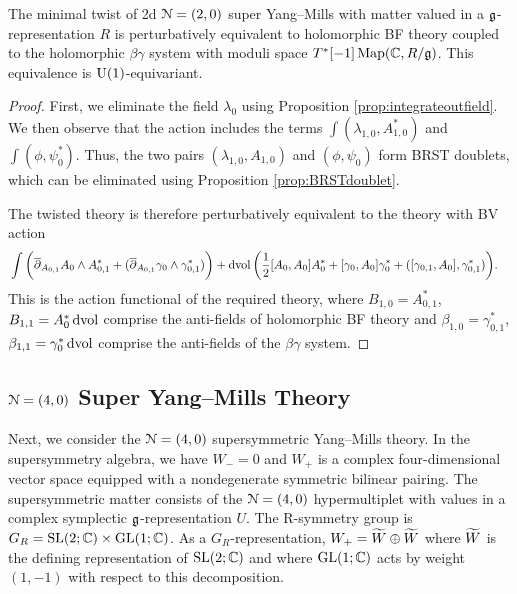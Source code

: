 \documentclass[10pt, oneside]{article}
\begin{document}
\begin{theorem} \label{thm:2d(2,0)}
The minimal twist of 2d $\cN=(2,0)$ super Yang--Mills with matter valued in a $\fg$-representation $R$ is perturbatively equivalent to holomorphic BF theory coupled to the holomorphic $\beta\gamma$ system with moduli space $T^*[-1] \map(\CC , R / \fg)$.
This equivalence is $\U(1)$-equivariant.
\end{theorem}
\begin{proof}
First, we eliminate the field $\lambda_{0}$ using Proposition \ref{prop:integrateoutfield}.  
We then observe that the action includes the terms $\int  (\lambda_{1,0} , A_{1,0}^*)$ and  $\int (\phi, \psi_0^*)$.  
Thus, the two pairs $(\lambda_{1,0}, A_{1,0})$ and $(\phi, \psi_0)$ form BRST doublets, 
which can be eliminated using Proposition \ref{prop:BRSTdoublet}.  

The twisted theory is therefore perturbatively equivalent to the theory with BV action 
\begin{align*}
& \int \bigg(\dbar_{A_{0,1}} A_{0} \wedge A_{0,1}^* + (\dbar_{A_{0,1}} \gamma_{0} \wedge \gamma_{0,1}^*) \bigg) + \dvol \bigg( \frac{1}{2}[A_0, A_0]A_0^*+ [\gamma_0, A_0] \gamma_0^* + ([\gamma_{0,1}, A_0] , \gamma_{0,1}^*)  \bigg).
\end{align*}
This is the action functional of the required theory, where $B_{1,0} = A_{0,1}^*$, $B_{1,1} = A_{0}^* \dvol$ comprise the anti-fields of holomorphic BF theory and $\beta_{1,0} = \gamma_{0,1}^*$,  $\beta_{1,1} = \gamma_0^* \dvol$ comprise the anti-fields of the $\beta\gamma$ system.
\end{proof}

\subsection{\texorpdfstring{$\cN=(4,0)$}{N=(4,0)} Super Yang--Mills Theory} \label{sect:2d(4,0)}

Next, we consider the $\cN=(4,0)$ supersymmetric Yang--Mills theory.
In the supersymmetry algebra, we have $W_- = 0$ and $W_+$ is a complex four-dimensional vector space equipped with a nondegenerate symmetric bilinear pairing.
The supersymmetric matter consists of the $\cN = (4,0)$ hypermultiplet with values in a complex symplectic $\fg$-representation $U$. 
The R-symmetry group is $G_R = \SL(2;\CC) \times \GL(1;\CC)$.
As a $G_R$-representation, $W_+ = \Tilde{W} \oplus \Tilde{W}$ where $\Tilde{W}$ is the defining representation of $\SL(2;\CC)$ and where $\GL(1;\CC)$ acts by weight $(1,-1)$ with respect to this decomposition. 
\end{document}
